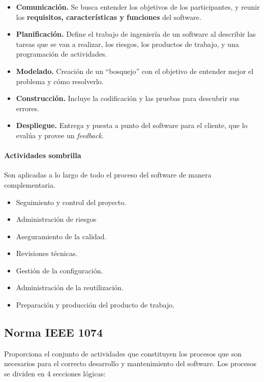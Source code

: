 \begin{itemize}
    \item \textbf{Comunicación.} Se busca entender los objetivos de los participantes, y reunir los \textbf{requisitos, características y funciones} del software.
    
    \item \textbf{Planificación.} Define el trabajo de ingeniería de un software al describir las tareas que se van a realizar, los riesgos, los productos de trabajo, y una programación de actividades.
    
    
    \item \textbf{Modelado.} Creación de un ``bosquejo'' con el objetivo de entender mejor el problema y cómo resolverlo.
    
    \item \textbf{Construcción.} Incluye la codificación y las pruebas para descubrir sus errores.
    
    \item \textbf{Despliegue.} Entrega y puesta a punto del software para el cliente, que lo evalúa y provee un \textit{feedback}.
\end{itemize}


\paragraph{Actividades sombrilla} Son aplicadas a lo largo de todo el proceso del software de manera complementaria.
\begin{itemize}
 \item Seguimiento y control del proyecto.
 \item Administración de riesgos
 \item Aseguramiento de la calidad.
 \item Revisiones técnicas.
 \item Gestión de la configuración. %
 \item Administración de la reutilización.
 \item Preparación y producción del producto de trabajo.

\end{itemize}



\subsection{Norma IEEE 1074}
Proporciona el conjunto de actividades que constituyen los procesos que son necesarios para el correcto desarrollo y mantenimiento del software. Los procesos se dividen en 4 secciones lógicas:

